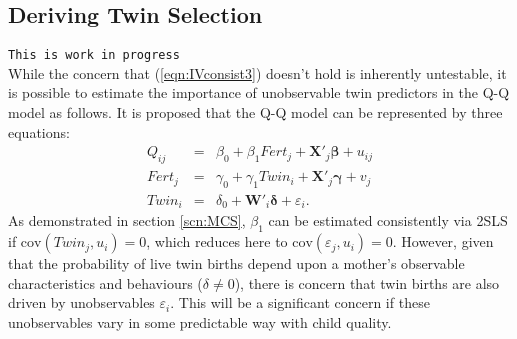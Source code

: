 \documentclass{article}[11pt,subeqn]
\newcommand{\vect}[1]{\mathbf{#1}}
\begin{document}
\begin{spacing}{1.5}

\section{Deriving Twin Selection}
\label{scn:TSAppend}
\texttt{This is work in progress}\\
While the concern that (\ref{eqn:IVconsist3}) doesn't hold is inherently untestable, it is possible to estimate
the importance of unobservable twin predictors in the Q-Q model as follows.  It is proposed that the Q-Q model 
can be represented by three equations:
\begin{subequations}
\label{eqn:Sderiv}
\begin{eqnarray}
\label{eqn:QQ}
Q_{ij}&=&\beta_0+\beta_1Fert_j+\vect{X}'_j\vect{\beta}+u_{ij} \label{eqn:Sderiva}\\
Fert_{j}&=&\gamma_0+\gamma_1Twin_{i}+\vect{X}'_j\vect{\gamma}+v_{j} \label{eqn:Sderivb} \\
Twin_i&=&\delta_0+\vect{W}'_i\vect{\delta}+\varepsilon_i. \label{eqn:Sderivc}
 \end{eqnarray}
\end{subequations}
As demonstrated in section \ref{scn:MCS}, $\beta_1$ can be estimated consistently via 2SLS if $\text{cov}(Twin_j, u_i)=0$,
which reduces here to $\text{cov}(\varepsilon_j, u_i)=0$.  However, given that the probability of live twin births depend 
upon a mother's observable characteristics and behaviours ($\delta\neq 0$), there is concern that twin births are also 
driven by unobservables $\varepsilon_i$.  This will be a significant concern if these unobservables vary in some predictable
way with child quality.


\end{spacing}
\end{document}

